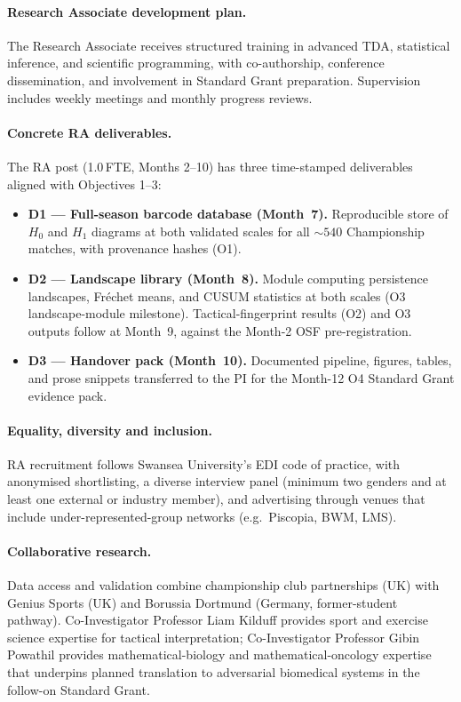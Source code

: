 \paragraph{Research Associate development plan.}
The Research Associate receives structured training in advanced TDA, statistical inference, and scientific programming, with co-authorship, conference dissemination, and involvement in Standard Grant preparation. Supervision includes weekly meetings and monthly progress reviews.

\paragraph{Concrete RA deliverables.}
The RA post (1.0\,FTE, Months 2--10) has three time-stamped deliverables aligned with Objectives 1--3:
\begin{itemize}
  \item \textbf{D1 --- Full-season barcode database (Month~7).} Reproducible store of $H_0$ and $H_1$ diagrams at both validated scales for all ${\sim}540$ Championship matches, with provenance hashes (O1).
  \item \textbf{D2 --- Landscape library (Month~8).} Module computing persistence landscapes, Fr\'echet means, and CUSUM statistics at both scales (O3 landscape-module milestone). Tactical-fingerprint results (O2) and O3 outputs follow at Month~9, against the Month-2 OSF pre-registration.
  \item \textbf{D3 --- Handover pack (Month~10).} Documented pipeline, figures, tables, and prose snippets transferred to the PI for the Month-12 O4 Standard Grant evidence pack.
\end{itemize}

\paragraph{Equality, diversity and inclusion.}
RA recruitment follows Swansea University's EDI code of practice, with anonymised shortlisting, a diverse interview panel (minimum two genders and at least one external or industry member), and advertising through venues that include under-represented-group networks (e.g.\ Piscopia, BWM, LMS).

\paragraph{Collaborative research.}
Data access and validation combine championship club partnerships (UK) with Genius Sports (UK) and Borussia Dortmund (Germany, former-student pathway). Co-Investigator Professor Liam Kilduff provides sport and exercise science expertise for tactical interpretation; Co-Investigator Professor Gibin Powathil provides mathematical-biology and mathematical-oncology expertise that underpins planned translation to adversarial biomedical systems in the follow-on Standard Grant.

